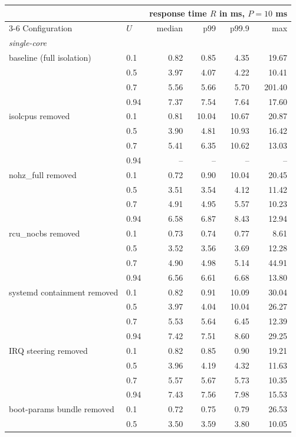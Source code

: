 \begin{tabular}{llrrrr}
\toprule
 &  & \multicolumn{4}{c}{response time $R$ in ms, $P = 10$ ms} \\
\cmidrule(lr){3-6}
Configuration & $U$ & median & p99 & p99.9 & max \\
\midrule
\multicolumn{6}{l}{\textit{single-core}} \\
baseline (full isolation) & 0.1 & 0.82 & 0.85 & 4.35 & 19.67 \\
 & 0.5 & 3.97 & 4.07 & 4.22 & 10.41 \\
 & 0.7 & 5.56 & 5.66 & 5.70 & 201.40 \\
 & 0.94 & 7.37 & 7.54 & 7.64 & 17.60 \\
\addlinespace
isolcpus removed & 0.1 & 0.81 & 10.04 & 10.67 & 20.87 \\
 & 0.5 & 3.90 & 4.81 & 10.93 & 16.42 \\
 & 0.7 & 5.41 & 6.35 & 10.62 & 13.03 \\
 & 0.94 & -- & -- & -- & -- \\
\addlinespace
nohz_full removed & 0.1 & 0.72 & 0.90 & 10.04 & 20.45 \\
 & 0.5 & 3.51 & 3.54 & 4.12 & 11.42 \\
 & 0.7 & 4.91 & 4.95 & 5.57 & 10.23 \\
 & 0.94 & 6.58 & 6.87 & 8.43 & 12.94 \\
\addlinespace
rcu_nocbs removed & 0.1 & 0.73 & 0.74 & 0.77 & 8.61 \\
 & 0.5 & 3.52 & 3.56 & 3.69 & 12.28 \\
 & 0.7 & 4.90 & 4.98 & 5.14 & 44.91 \\
 & 0.94 & 6.56 & 6.61 & 6.68 & 13.80 \\
\addlinespace
systemd containment removed & 0.1 & 0.82 & 0.91 & 10.09 & 30.04 \\
 & 0.5 & 3.97 & 4.04 & 10.04 & 26.27 \\
 & 0.7 & 5.53 & 5.64 & 6.45 & 12.39 \\
 & 0.94 & 7.42 & 7.51 & 8.60 & 29.25 \\
\addlinespace
IRQ steering removed & 0.1 & 0.82 & 0.85 & 0.90 & 19.21 \\
 & 0.5 & 3.96 & 4.19 & 4.32 & 11.63 \\
 & 0.7 & 5.57 & 5.67 & 5.73 & 10.35 \\
 & 0.94 & 7.43 & 7.56 & 7.98 & 15.53 \\
\addlinespace
boot-params bundle removed & 0.1 & 0.72 & 0.75 & 0.79 & 26.53 \\
 & 0.5 & 3.50 & 3.59 & 3.80 & 10.05 \\

\end{tabular}
